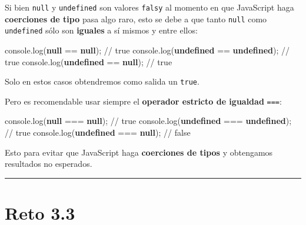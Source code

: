 \documentclass[
  letterpaper,
  DIV=11,
  numbers=noendperiod]{scrreprt}
\newenvironment{Shaded}{\begin{snugshade}}{\end{snugshade}}
\newcommand{\BuiltInTok}[1]{\textcolor[rgb]{0.00,0.23,0.31}{#1}}
\newcommand{\CommentTok}[1]{\textcolor[rgb]{0.37,0.37,0.37}{#1}}
\newcommand{\FunctionTok}[1]{\textcolor[rgb]{0.28,0.35,0.67}{#1}}
\newcommand{\KeywordTok}[1]{\textcolor[rgb]{0.00,0.23,0.31}{\textbf{#1}}}
\newcommand{\NormalTok}[1]{\textcolor[rgb]{0.00,0.23,0.31}{#1}}
\newcommand{\OperatorTok}[1]{\textcolor[rgb]{0.37,0.37,0.37}{#1}}
\begin{document}
Si bien \texttt{null} y \texttt{undefined} son valores \texttt{falsy} al
momento en que JavaScript haga \textbf{coerciones de tipo} pasa algo
raro, esto se debe a que tanto \texttt{null} como \texttt{undefined}
sólo son \textbf{iguales} a sí mismos y entre ellos:

\begin{Shaded}
\begin{Highlighting}[]
\BuiltInTok{console}\OperatorTok{.}\FunctionTok{log}\NormalTok{(}\KeywordTok{null} \OperatorTok{==} \KeywordTok{null}\NormalTok{)}\OperatorTok{;} \CommentTok{// true}
\BuiltInTok{console}\OperatorTok{.}\FunctionTok{log}\NormalTok{(}\KeywordTok{undefined} \OperatorTok{==} \KeywordTok{undefined}\NormalTok{)}\OperatorTok{;} \CommentTok{// true}
\BuiltInTok{console}\OperatorTok{.}\FunctionTok{log}\NormalTok{(}\KeywordTok{undefined} \OperatorTok{==} \KeywordTok{null}\NormalTok{)}\OperatorTok{;} \CommentTok{// true}
\end{Highlighting}
\end{Shaded}

Solo en estos casos obtendremos como salida un \texttt{true}.

Pero es recomendable usar siempre el \textbf{operador estricto de
igualdad} \texttt{===}:

\begin{Shaded}
\begin{Highlighting}[]
\BuiltInTok{console}\OperatorTok{.}\FunctionTok{log}\NormalTok{(}\KeywordTok{null} \OperatorTok{===} \KeywordTok{null}\NormalTok{)}\OperatorTok{;} \CommentTok{// true}
\BuiltInTok{console}\OperatorTok{.}\FunctionTok{log}\NormalTok{(}\KeywordTok{undefined} \OperatorTok{===} \KeywordTok{undefined}\NormalTok{)}\OperatorTok{;} \CommentTok{// true}
\BuiltInTok{console}\OperatorTok{.}\FunctionTok{log}\NormalTok{(}\KeywordTok{undefined} \OperatorTok{===} \KeywordTok{null}\NormalTok{)}\OperatorTok{;} \CommentTok{// false}
\end{Highlighting}
\end{Shaded}

Esto para evitar que JavaScript haga \textbf{coerciones de tipos} y
obtengamos resultados no esperados.

\begin{center}\rule{0.5\linewidth}{0.5pt}\end{center}

\section{Reto 3.3}\label{sec-sol-cap3-reto3}
\end{document}
